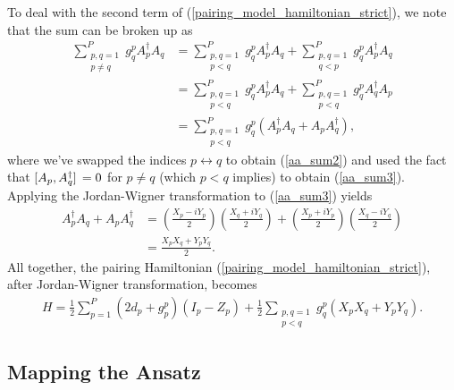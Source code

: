 \documentclass[Dual]{msu-thesis}
\begin{document}
To deal with the second term of (\ref{pairing_model_hamiltonian_strict}), we note that the sum can be broken up as
\begin{align}
\sum_{\substack{p,q=1 \\ p\neq q}}^Pg^p_qA^\dagger_pA_q
&=
\sum_{\substack{p,q=1 \\ p<q}}^Pg^p_qA^\dagger_pA_q
+
\sum_{\substack{p,q=1 \\ q<p}}^Pg^p_qA^\dagger_pA_q
\\
\label{aa_sum2}
&=
\sum_{\substack{p,q=1 \\ p<q}}^Pg^p_qA^\dagger_pA_q
+
\sum_{\substack{p,q=1 \\ p<q}}^Pg^p_qA^\dagger_qA_p
\\
\label{aa_sum3}
&=
\sum_{\substack{p,q=1 \\ p<q}}^Pg^p_q(A^\dagger_pA_q+A_pA^\dagger_q)
,\end{align}
where we've swapped the indices $p\leftrightarrow q$ to obtain (\ref{aa_sum2}) and used the fact that $\comm*{A_p}{A^\dagger_q}=0$ for $p\neq q$ (which $p<q$ implies) to obtain (\ref{aa_sum3}). Applying the Jordan-Wigner transformation to (\ref{aa_sum3}) yields
\begin{align}
A^\dagger_pA_q+A_pA^\dagger_q
&=
\left(\frac{X_p-iY_p}{2}\right)\left(\frac{X_q+iY_q}{2}\right)
+
\left(\frac{X_p+iY_p}{2}\right)\left(\frac{X_q-iY_q}{2}\right)
\\
&=
\frac{X_pX_q+Y_pY_q}{2}.
\end{align}
All together, the pairing Hamiltonian (\ref{pairing_model_hamiltonian_strict}), after Jordan-Wigner transformation, becomes
\begin{align}
\label{pairing_model_hamiltonian_mapped}
H
=
\frac{1}{2}\sum_{p=1}^P(2d_p+g^p_p)(I_p-Z_p)
+
\frac{1}{2}\sum_{\substack{p,q=1 \\ p<q}}g^p_q(X_pX_q+Y_pY_q).
\end{align}

\subsection{Mapping the Ansatz}
\end{document}
